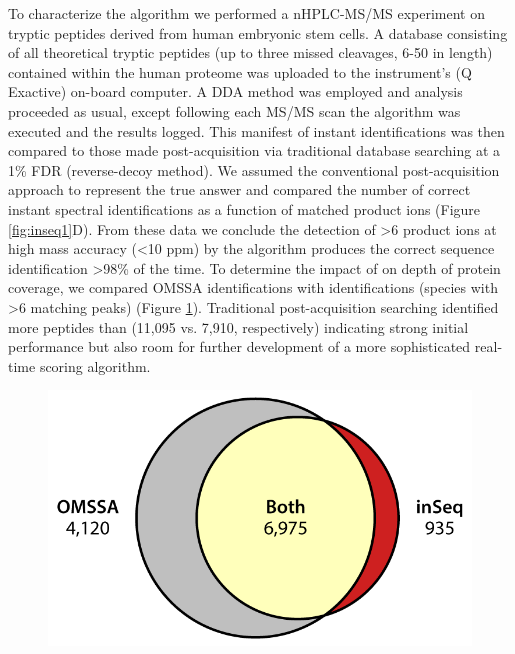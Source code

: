 To characterize the \inseq{} algorithm we performed a nHPLC-MS/MS experiment on tryptic peptides derived from human embryonic stem cells. A database consisting of all theoretical tryptic peptides (up to three missed cleavages, 6-50 in length) contained within the human proteome was uploaded to the instrument's (Q Exactive) on-board computer. A DDA method was employed and analysis proceeded as usual, except following each MS/MS scan the \inseq{} algorithm was executed and the results logged. This manifest of instant identifications was then compared to those made post-acquisition via traditional database searching at a 1\% FDR (reverse-decoy method). We assumed the conventional post-acquisition approach to represent the true answer and compared the number of correct instant spectral identifications as a function of matched product ions (Figure \ref{fig:inseq1}D). From these data we conclude the detection of >6 product ions at high mass accuracy (<10 ppm) by the \inseq{} algorithm produces the correct sequence identification >98\% of the time. To determine the impact of \inseq{} on depth of protein coverage, we compared OMSSA identifications with \inseq{} identifications (species with >6 matching peaks) (Figure \ref{fig:inseqs3}). Traditional post-acquisition searching identified more peptides than \inseq{} (11,095 vs. 7,910, respectively) indicating strong initial performance but also room for further development of a more sophisticated real-time scoring algorithm.
\begin{figure}
	\centering
	\includegraphics[width=\columnwidth]{inseq/inSeq_Fig S3.png}
	\label{fig:inseqs3}
\end{figure}

